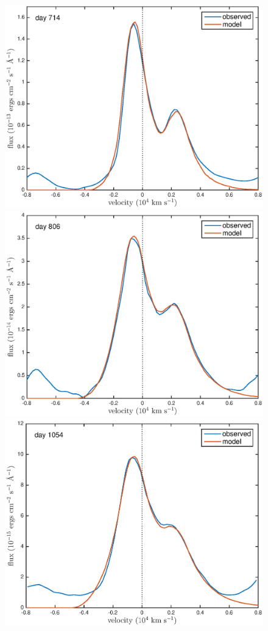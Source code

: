 \documentclass[useAMS,usenatbib,usegraphicx]{mnras}
\begin{document}
\begin{figure}
\begin{center}

\includegraphics[trim =33 10 45 15,clip=true,scale=0.47]{smooth/best_fit/d714OI_ext}
\includegraphics[trim =33 10 45 15,clip=true,scale=0.47]{smooth/best_fit/d806OI_ext}
\includegraphics[trim =33 10 45 15,clip=true,scale=0.47]{smooth/best_fit/d1054OI}

\end{center}
\end{figure}
\end{document}
